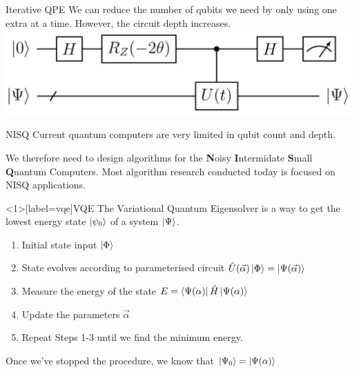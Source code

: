 \documentclass{beamer}
\begin{document}
\begin{frame}{Iterative QPE}
    We can reduce the number of qubits we need by only using one extra at a time.\vfill
    However, the circuit depth increases.
    \vfill
    \centering
    \includegraphics[width=\textwidth]{images/iQPE.png}
\end{frame}

\begin{frame}{NISQ}
    Current quantum computers are very limited in qubit count and depth.\vfill

    We therefore need to design algorithms for the \textbf{N}oisy \textbf{I}ntermidate \textbf{S}mall \textbf{Q}uantum Computers.
    \vfill
    Most algorithm research conducted today is focused on NISQ applications.
\end{frame}

\begin{frame}<1>[label=vqe]{VQE}
    The Variational Quantum Eigensolver is a way to get the lowest energy state $\ket{\psi_0}$ of a system $\ket{\Psi}$.\vfill
    \begin{enumerate}
        \item<1->Initial state input $\ket{\Phi}$
        \pause
        \item<2-> State evolves according to parameterised circuit $\hat{U}(\vec{\alpha})\ket{\Phi} = \ket{\Psi(\vec{\alpha})}$
        \pause
        \item<3->Measure the energy of the state $E=\bra{\Psi(\alpha)}\hat{H}\ket{\Psi(\alpha)}$
        \pause
        \item<4->Update the parameters $\vec{\alpha}$
        \pause
        \item<5->Repeat Steps 1-3 until we find the minimum energy.
    \end{enumerate}\vfill
    \pause
    Once we've stopped the procedure, we know that $\ket{\Psi_0} = \ket{\Psi(\alpha)}$

\end{frame}
\end{document}
